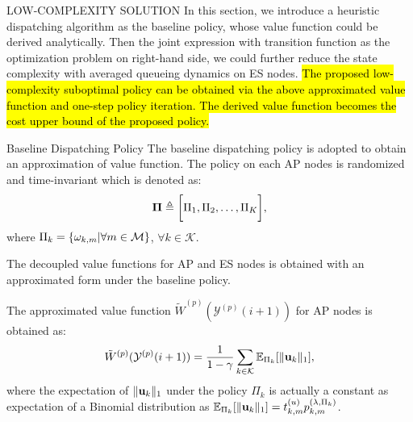 \documentclass[10pt, conference, letterpaper]{IEEEtran}
\newcommand{\define}{\triangleq}
\renewcommand{\vec}{\mathbf}
\DeclarePairedDelimiter{\set}{\{}{\}}
\DeclarePairedDelimiter{\Inorm}{\|}{\|_1}
\DeclarePairedDelimiter{\Bracket}{\bigg[}{\bigg]}
\newcommand{\apSet}{\mathcal{K}}
\newcommand{\esSet}{\mathcal{M}}
\newcommand{\Obsv}{\mathcal{Y}}
\begin{document}
    \begin{section}{LOW-COMPLEXITY SOLUTION}
        \label{sec:algorithm}
        In this section, we introduce a heuristic dispatching algorithm as the baseline policy, whose value function could be derived analytically. Then the joint expression with transition function as the optimization problem on right-hand side, we could further reduce the state complexity with averaged queueing dynamics on ES nodes.
        \hl{The proposed low-complexity suboptimal policy can be obtained via the above approximated value function and one-step policy iteration. The derived value function becomes the cost upper bound of the proposed policy.}

        \begin{subsection}{Baseline Dispatching Policy}
            The baseline dispatching policy is adopted to obtain an approximation of value function. The policy on each AP nodes is randomized and time-invariant which is denoted as:
            \begin{align}
                \vec{\Pi} \define \Bracket{\Pi_1, \Pi_2, \dots, \Pi_K},
            \end{align}
            where $\Pi_k = \set{\omega_{k,m}|\forall m\in\esSet}$, $\forall k\in\apSet$.

            The decoupled value functions for AP and ES nodes is obtained with an approximated form under the baseline policy.
            
            The approximated value function $\tilde{W}^{(p)}(\Obsv^{(p)}(i+1))$ for AP nodes is obtained as:
            \begin{align}
                \tilde{W}^{(p)}(\Obsv^{(p)}(i+1))
                = \frac{1}{1-\gamma} \sum_{k\in\apSet} \mathbb{E}_{\Pi_k}[\Inorm{\vec{u}_k}],
            \end{align}
            where the expectation of $\Inorm{\vec{u}_k}$ under the policy $\Pi_k$ is actually a constant as expectation of a Binomial distribution as $\mathbb{E}_{\Pi_k}[\Inorm{\vec{u}_k}] = t^{(u)}_{k,m} p^{(\lambda, \Pi_k)}_{k,m}$.
            

\end{subsection}
\end{section}
\end{document}
